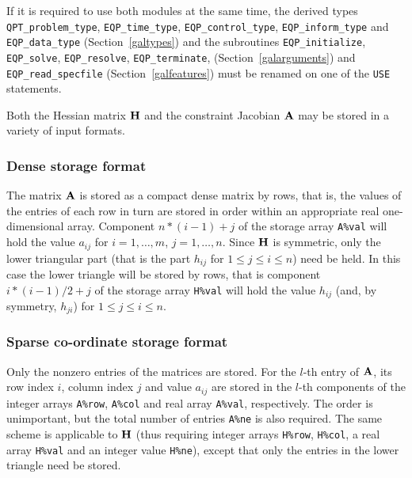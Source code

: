 \documentclass{galahad}
\newcommand{\packagename}{EQP}
\begin{document}
\noindent
If it is required to use both modules at the same time, the derived types 
{\tt QPT\_problem\_type}, 
{\tt \packagename\_time\_type}, 
{\tt \packagename\_\-control\-\_type}, 
{\tt \packagename\_inform\_type} 
and
{\tt \packagename\_data\_type}
(Section~\ref{galtypes})
and the subroutines
{\tt \packagename\_initialize}, 
{\tt \packagename\_\-solve},
{\tt \packagename\_\-resolve},
{\tt \packagename\_\-terminate},
(Section~\ref{galarguments})
and 
{\tt \packagename\_read\_specfile}
(Section~\ref{galfeatures})
must be renamed on one of the {\tt USE} statements.


\galmatrix
Both the Hessian matrix ${\mathbf{H}}$ and the constraint Jacobian ${\mathbf{A}}$
may be stored in a variety of input formats.

\subsubsection{Dense storage format}\label{dense}
The matrix ${\mathbf{A}}$ is stored as a compact 
dense matrix by rows, that is, the values of the entries of each row in turn are
stored in order within an appropriate real one-dimensional array.
Component $n \ast (i-1) + j$ of the storage array {\tt A\%val} will hold the 
value $a_{ij}$ for $i = 1, \ldots , m$, $j = 1, \ldots , n$.
Since ${\mathbf{H}}$ is symmetric, only the lower triangular part (that is the part 
$h_{ij}$ for $1 \leq j \leq i \leq n$) need be held. In this case
the lower triangle will be stored by rows, that is 
component $i \ast (i-1)/2 + j$ of the storage array {\tt H\%val}  
will hold the value $h_{ij}$ (and, by symmetry, $h_{ji}$)
for $1 \leq j \leq i \leq n$.

\subsubsection{Sparse co-ordinate storage format}\label{coordinate}
Only the nonzero entries of the matrices are stored. For the 
$l$-th entry of ${\mathbf{A}}$, its row index $i$, column index $j$ 
and value $a_{ij}$
are stored in the $l$-th components of the integer arrays {\tt A\%row}, 
{\tt A\%col} and real array {\tt A\%val}, respectively.
The order is unimportant, but the total
number of entries {\tt A\%ne} is also required. 
The same scheme is applicable to
${\mathbf{H}}$ (thus requiring integer arrays {\tt H\%row}, {\tt H\%col}, a real array 
{\tt H\%val} and an integer value {\tt H\%ne}),
except that only the entries in the lower triangle need be stored.
\end{document}
